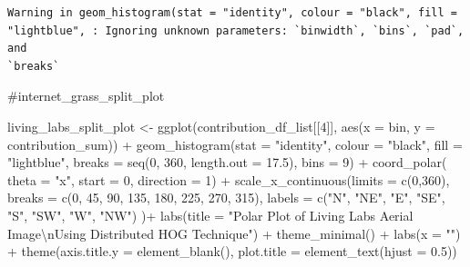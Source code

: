 \documentclass[
  letterpaper,
  DIV=11,
  numbers=noendperiod]{scrreprt}
\newenvironment{Shaded}{\begin{snugshade}}{\end{snugshade}}
\newcommand{\AttributeTok}[1]{\textcolor[rgb]{0.40,0.45,0.13}{#1}}
\newcommand{\CommentTok}[1]{\textcolor[rgb]{0.37,0.37,0.37}{#1}}
\newcommand{\DecValTok}[1]{\textcolor[rgb]{0.68,0.00,0.00}{#1}}
\newcommand{\FloatTok}[1]{\textcolor[rgb]{0.68,0.00,0.00}{#1}}
\newcommand{\FunctionTok}[1]{\textcolor[rgb]{0.28,0.35,0.67}{#1}}
\newcommand{\NormalTok}[1]{\textcolor[rgb]{0.00,0.23,0.31}{#1}}
\newcommand{\OtherTok}[1]{\textcolor[rgb]{0.00,0.23,0.31}{#1}}
\newcommand{\SpecialCharTok}[1]{\textcolor[rgb]{0.37,0.37,0.37}{#1}}
\newcommand{\StringTok}[1]{\textcolor[rgb]{0.13,0.47,0.30}{#1}}
\begin{document}
\begin{verbatim}
Warning in geom_histogram(stat = "identity", colour = "black", fill =
"lightblue", : Ignoring unknown parameters: `binwidth`, `bins`, `pad`, and
`breaks`
\end{verbatim}

\begin{Shaded}
\begin{Highlighting}[]
\CommentTok{\#internet\_grass\_split\_plot}
\end{Highlighting}
\end{Shaded}

\begin{Shaded}
\begin{Highlighting}[]
\NormalTok{living\_labs\_split\_plot }\OtherTok{\textless{}{-}}
  \FunctionTok{ggplot}\NormalTok{(contribution\_df\_list[[}\DecValTok{4}\NormalTok{]], }
         \FunctionTok{aes}\NormalTok{(}\AttributeTok{x =}\NormalTok{ bin, }\AttributeTok{y =}\NormalTok{ contribution\_sum)) }\SpecialCharTok{+}
  \FunctionTok{geom\_histogram}\NormalTok{(}\AttributeTok{stat =} \StringTok{"identity"}\NormalTok{,}
                 \AttributeTok{colour =} \StringTok{"black"}\NormalTok{, }
                 \AttributeTok{fill =} \StringTok{"lightblue"}\NormalTok{, }
                 \AttributeTok{breaks =} \FunctionTok{seq}\NormalTok{(}\DecValTok{0}\NormalTok{, }\DecValTok{360}\NormalTok{, }\AttributeTok{length.out =} \FloatTok{17.5}\NormalTok{),}
                 \AttributeTok{bins =} \DecValTok{9}\NormalTok{) }\SpecialCharTok{+}
  \FunctionTok{coord\_polar}\NormalTok{(}
    \AttributeTok{theta =} \StringTok{"x"}\NormalTok{, }\AttributeTok{start =} \DecValTok{0}\NormalTok{, }\AttributeTok{direction =} \DecValTok{1}\NormalTok{) }\SpecialCharTok{+}
  \FunctionTok{scale\_x\_continuous}\NormalTok{(}\AttributeTok{limits =} \FunctionTok{c}\NormalTok{(}\DecValTok{0}\NormalTok{,}\DecValTok{360}\NormalTok{),}
    \AttributeTok{breaks =} \FunctionTok{c}\NormalTok{(}\DecValTok{0}\NormalTok{, }\DecValTok{45}\NormalTok{, }\DecValTok{90}\NormalTok{, }\DecValTok{135}\NormalTok{, }\DecValTok{180}\NormalTok{, }\DecValTok{225}\NormalTok{, }\DecValTok{270}\NormalTok{, }\DecValTok{315}\NormalTok{), }
    \AttributeTok{labels =} \FunctionTok{c}\NormalTok{(}\StringTok{"N"}\NormalTok{, }\StringTok{"NE"}\NormalTok{, }\StringTok{"E"}\NormalTok{, }\StringTok{"SE"}\NormalTok{, }\StringTok{"S"}\NormalTok{, }\StringTok{"SW"}\NormalTok{, }\StringTok{"W"}\NormalTok{, }\StringTok{"NW"}\NormalTok{)}
\NormalTok{  )}\SpecialCharTok{+}
  \FunctionTok{labs}\NormalTok{(}\AttributeTok{title =} \StringTok{"Polar Plot of Living Labs Aerial Image}\SpecialCharTok{\textbackslash{}n}\StringTok{Using Distributed HOG Technique"}\NormalTok{) }\SpecialCharTok{+}
  \FunctionTok{theme\_minimal}\NormalTok{() }\SpecialCharTok{+}
  \FunctionTok{labs}\NormalTok{(}\AttributeTok{x =} \StringTok{""}\NormalTok{) }\SpecialCharTok{+}
  \FunctionTok{theme}\NormalTok{(}\AttributeTok{axis.title.y =} \FunctionTok{element\_blank}\NormalTok{(),}
        \AttributeTok{plot.title =} \FunctionTok{element\_text}\NormalTok{(}\AttributeTok{hjust =} \FloatTok{0.5}\NormalTok{))}
\end{Highlighting}
\end{Shaded}
\end{document}
